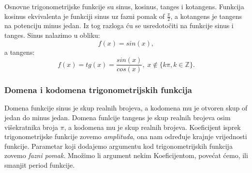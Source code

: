 \newcommand{\trig}{trigonometrijskih funkcija}
Osnovne trigonometrijske funkcije su sinus, kosinus, tanges i kotangens.
Funkcija kosinus ekvivalenta je funkciji sinus uz fazni pomak of \(\frac{\pi}{2}\), a kotangens je tangens na potenciju minus jedan.
Iz tog razloga ću se usredotočiti na funkcije sinus i tanges.
Sinus nalazimo u obliku:
\[f(x) = sin(x),\]
a tangens:
\[f(x) = tg(x) = \frac{sin(x)}{cos(x)},\; x \notin \{k\pi, k \in \mathbb{Z}\}.\]
\subsubsection{Domena i kodomena \trig}
    Domena funkcije sinus je skup realnih brojeva, a kodomena mu je otvoren skup of jedan do minus jedan.
    Domena funlcije tangens je skup realnih brojeva osim višekratnika broja \(\pi\), a kodomena mu je skup realnih brojeva.
    Koeficijent isprek trigonometrijske funkcije zovemo \emph{amplituda}, ona nam određuje krajnje vrijednosti funkcije.
    Parametar koji dodajemo argumentu kod trigonometrijskih funkcija zovemo \emph{fazni pomak}.
    Množimo li argument nekim Koeficijentom, povećat ćemo, ili smanjit period funkcije.


